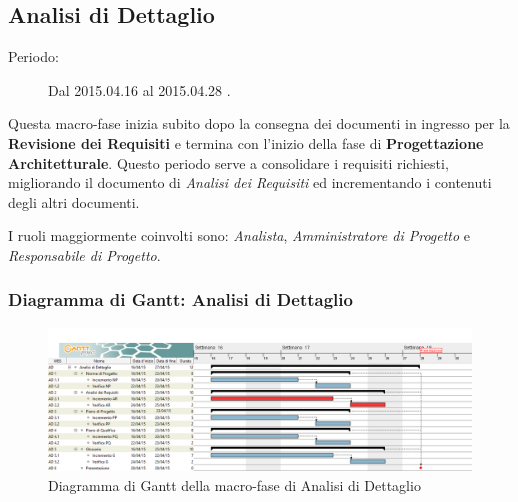 \newpage
\subsection{Analisi di Dettaglio}
\begin{description}
	\item[Periodo:] Dal 2015.04.16 al 2015.04.28 .
\end{description}
Questa macro-fase inizia subito dopo la consegna dei documenti in ingresso per la \textbf{Revisione dei Requisiti} e termina con l'inizio della fase di \textbf{Progettazione Architetturale}. Questo periodo serve a consolidare i requisiti richiesti, migliorando il documento di \textit{Analisi dei Requisiti} ed incrementando i contenuti degli altri documenti. 

\noindent I ruoli maggiormente coinvolti sono: \textit{Analista}, \textit{Amministratore di Progetto} e \textit{Responsabile di Progetto}.
\subsubsection{Diagramma di Gantt: Analisi di Dettaglio}
\begin{figure}[h]
\centering
\includegraphics[width=\textwidth]{./img/analisi_dettaglio.png}
\caption{Diagramma di Gantt della macro-fase di Analisi di Dettaglio}
\end{figure}

\newpage
